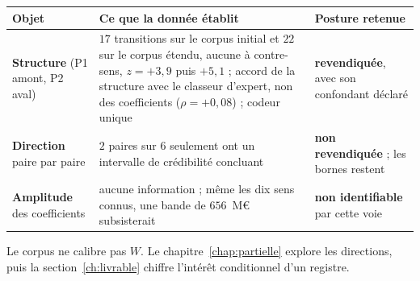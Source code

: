 \begin{center}\small
\renewcommand{\arraystretch}{1.3}
\begin{tabular}{@{}p{3.2cm} p{7.4cm} p{4.2cm}@{}}
\toprule
\textbf{Objet} & \textbf{Ce que la donnée établit} & \textbf{Posture retenue} \\
\midrule
\textbf{Structure} \newline (P1 amont, P2 aval) &
$17$ transitions sur le corpus initial et $22$ sur le corpus étendu, aucune à contre-sens,
$z=+3{,}9$ puis $+5{,}1$ ; accord de la structure avec le classeur d'expert, non des coefficients ($\rho=+0{,}08$) ; codeur unique &
\textbf{revendiquée}, avec son confondant déclaré \\
\textbf{Direction} \newline paire par paire &
$2$ paires sur $6$ seulement ont un intervalle de crédibilité concluant &
\textbf{non revendiquée} ; les bornes restent \\
\textbf{Amplitude} \newline des coefficients &
aucune information ; même les dix sens connus, une bande de $656$~M\euro{} subsisterait &
\textbf{non identifiable} par cette voie \\
\bottomrule
\end{tabular}
\end{center}

\vspace{4pt}
\noindent Le corpus ne calibre pas $W$. Le chapitre~\ref{chap:partielle} explore les directions,
puis la section~\ref{ch:livrable} chiffre l'intérêt conditionnel d'un registre.

